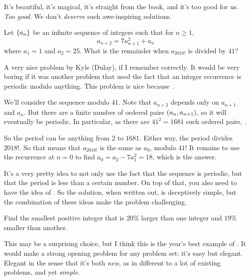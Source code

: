 \documentclass[11pt,paper=letter]{scrartcl}
\begin{document}
It's beautiful, it's magical, it's straight from the book, and it's too good for us. \emph{Too good}. We don't \emph{deserve} such awe-inspiring solutions.

\begin{probboxed}
   Let $\left\{ a_n \right\}$ be an infinite sequence of integers such that for $n \geq 1$, $$a_{n+2} = 7a_{n+1}^2 + a_n$$ where $a_1 = 1$ and $a_2 = 25$. What is the remainder when $a_{2018!}$ is divided by $41$?
\end{probboxed}

A very nice problem by Kyle (Dulay), if I remember correctly. It would be very boring if it was another problem that used the fact that an integer recurrence is periodic modulo anything. This problem is nice because .

We'll consider the sequence modulo $41$. Note that $a_{n+2}$ depends only on $a_{n+1}$ and $a_n$. But there are a finite number of ordered pairs $\left( a_n, a_{n+1} \right)$, so it will eventually be periodic. In particular, as there are $41^2 = 1681$ such ordered pairs, .

So the period can be anything from $2$ to $1681$. Either way, the period divides $2018!$. So that means that $a_{2018!}$ is the same as $a_0$, modulo $41$! It remains to use the recurrence at $n = 0$ to find $a_0 = a_2 - 7a_1^2 = 18$, which is the answer.

It's a very pretty idea to not only use the fact that the sequence is periodic, but that the period is less than a certain number. On top of that, you also need to have the idea of . So the solution, when written out, is deceptively simple, but the combination of these ideas make the problem challenging.

\begin{probboxed}
   Find the smallest positive integer that is $20\%$ larger than one integer and $19\%$ smaller than another.
\end{probboxed}

This may be a surprising choice, but I think this is the year's best example of . It would make a strong opening problem for any problem set: it's easy but elegant. Elegant in the sense that it's both \emph{new}, as in different to a lot of existing problems, and yet \emph{simple}. 
\end{document}
